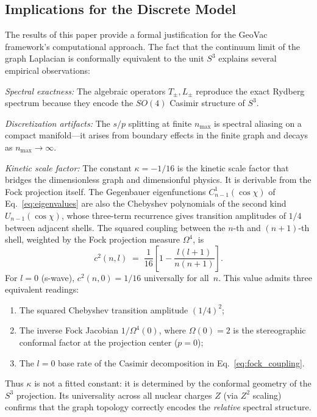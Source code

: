 \documentclass[aps,pra,twocolumn,superscriptaddress,longbibliography]{revtex4-2}
\begin{document}
\subsection{Implications for the Discrete Model}

The results of this paper provide a formal justification for the GeoVac framework's computational approach. The fact that the continuum limit of the graph Laplacian is conformally equivalent to the unit $S^3$ explains several empirical observations:

\textit{Spectral exactness:} The algebraic operators $T_\pm, L_\pm$ reproduce the exact Rydberg spectrum because they encode the $SO(4)$ Casimir structure of $S^3$.

\textit{Discretization artifacts:} The $s/p$ splitting at finite $n_{\max}$ is spectral aliasing on a compact manifold---it arises from boundary effects in the finite graph and decays as $n_{\max} \to \infty$.

\textit{Kinetic scale factor:} The constant $\kappa = -1/16$ is the
kinetic scale factor that bridges the dimensionless graph and
dimensionful physics.  It is derivable from the Fock projection
itself.  The Gegenbauer eigenfunctions $C^1_{n-1}(\cos\chi)$ of
Eq.~\eqref{eq:eigenvalues} are also the Chebyshev polynomials of the
second kind $U_{n-1}(\cos\chi)$, whose three-term recurrence gives
transition amplitudes of $1/4$ between adjacent shells.  The squared
coupling between the $n$-th and $(n+1)$-th shell, weighted by the Fock
projection measure $\Omega^4$, is
\begin{equation}
  c^2(n,l) \;=\; \frac{1}{16}\!\left[
    1 - \frac{l(l+1)}{n(n+1)} \right].
  \label{eq:fock_coupling}
\end{equation}
For $l = 0$ (s-wave), $c^2(n,0) = 1/16$ universally for all~$n$.
This value admits three equivalent readings:
\begin{enumerate}
  \item The squared Chebyshev transition amplitude $(1/4)^2$;
  \item The inverse Fock Jacobian $1/\Omega^4(0)$, where $\Omega(0) = 2$
        is the stereographic conformal factor at the projection center
        ($p = 0$);
  \item The $l = 0$ base rate of the Casimir decomposition in
        Eq.~\eqref{eq:fock_coupling}.
\end{enumerate}
Thus $\kappa$ is not a fitted constant: it is determined by the
conformal geometry of the $S^3$ projection.  Its universality across
all nuclear charges $Z$ (via $Z^2$ scaling) confirms that the graph
topology correctly encodes the \textit{relative} spectral structure.
\end{document}
